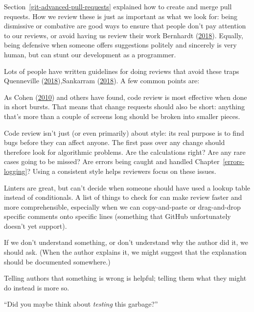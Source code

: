 \documentclass[
]{krantz}
\providecommand{\tightlist}{%
  \setlength{\itemsep}{0pt}\setlength{\parskip}{0pt}}
\begin{document}
Section~\ref{git-advanced-pull-requests} explained how to create and merge pull requests.
How we review these is just as important as what we look for:
being dismissive or combative are good ways to ensure that people don't pay attention to our reviews,
or avoid having us review their work Bernhardt (\protect\hyperlink{ref-Bern2018}{2018}).
Equally,
being defensive when someone offers suggestions politely and sincerely is very human,
but can stunt our development as a programmer.

Lots of people have written guidelines for doing reviews that avoid these traps Quenneville (\protect\hyperlink{ref-Quen2018}{2018}),Sankarram (\protect\hyperlink{ref-Sank2018}{2018}).
A few common points are:

\begin{description}
\tightlist
\item[Work in small increments.]
As Cohen (\protect\hyperlink{ref-Cohe2010}{2010}) and others have found,
code review is most effective when done in short bursts.
That means that change requests should also be short:
anything that's more than a couple of screens long
should be broken into smaller pieces.
\item[Look for algorithmic problems first.]
Code review isn't just (or even primarily) about style:
its real purpose is to find bugs before they can affect anyone.
The first pass over any change should therefore look for algorithmic problems.
Are the calculations right?
Are any rare cases going to be missed?
Are errors being caught and handled Chapter~\ref{errors-logging}?
Using a consistent style helps reviewers focus on these issues.
\item[Use a checklist.]
Linters are great,
but can't decide when someone should have used a lookup table instead of conditionals.
A list of things to check for can make review faster and more comprehensible,
especially when we can copy-and-paste or drag-and-drop specific comments
onto specific lines
(something that GitHub unfortunately doesn't yet support).
\item[Ask for clarification.]
If we don't understand something,
or don't understand why the author did it,
we should ask.
(When the author explains it,
we might suggest that the explanation should be documented somewhere.)
\item[Offer alternatives.]
Telling authors that something is wrong is helpful;
telling them what they might do instead is more so.
\item[Don't be sarcastic or disparaging.]
``Did you maybe think about \emph{testing} this garbage?''

\end{description}
\end{document}
